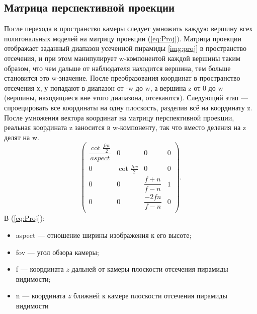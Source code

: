\subsection{Матрица перспективной проекции}
После перехода в пространство камеры следует умножить каждую
вершину всех полигональных моделей на матрицу проекции (\ref{eq:Proj}). Матрица проекции отображает заданный диапазон усеченной пирамиды \ref{img:proj} в пространство
отсечения, и при этом манипулирует w-компонентой каждой вершины таким образом, что чем дальше от наблюдателя находится вершина, тем
больше становится это w-значение. После преобразования координат в пространство отсечения х, у попадают в диапазон от -w до w, а вершина z от
0 до w (вершины, находящиеся вне этого диапазона, отсекаются). Следующий этап --- спроецировать все координаты на одну плоскость, разделив всё на координату z. После умножения вектора координат на матрицу перспективной проекции, реальная координата z заносится в w-компоненту, так что вместо деления на z делят на w. 
	\begin{equation}
	\label{eq:Proj}
	\begin{pmatrix}
		\dfrac{\cot{\frac{fov}{2}}}{aspect} & 0 & 0 & 0 \\
		0 & \cot{\frac{fov}{2}} & 0 & 0 \\
		0 & 0 & \dfrac{f+n}{f-n} & 1 \\
		0 & 0 & \dfrac{-2fn}{f-n} & 0 \\
	\end{pmatrix}.
\end{equation}
В (\ref{eq:Proj}):
\begin{itemize}
	\item aspect --- отношение ширины изображения к его высоте;
	\item fov --- угол обзора камеры;
	\item f --- координата $z$ дальней от камеры плоскости отсечения пирамиды
	видимости;
	\item n --- координата $z$ ближней к камере плоскости отсечения пирамиды
	видимости
\end{itemize}
\begin{center}
	\label{img:proj}
\end{center}
